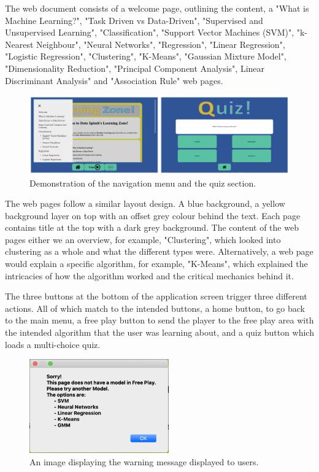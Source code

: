 		The web document consists of a welcome page, outlining the content, a "What is Machine Learning?", "Task Driven vs Data-Driven", "Supervised and Unsupervised Learning", "Classification", "Support Vector Machines (SVM)", "k-Nearest Neighbour", "Neural Networks", "Regression", "Linear Regression", "Logistic Regression", "Clustering", "K-Means", "Gaussian Mixture Model", "Dimensionality Reduction", "Principal Component Analysis", Linear Discriminant Analysis" and "Association Rule" web pages.
		
		\begin{figure}[t]
			\begin{center}
				\includegraphics[width=15cm]{graphics/lz_navi_quiz.png}
				\caption{Demonstration of the navigation menu and the quiz section.}
				\label{fig:lz_navi_quiz}
			\end{center}
		\end{figure}
	
		The web pages follow a similar layout design. A blue background, a yellow background layer on top with an offset grey colour behind the text. Each page contains title at the top with a dark grey background. The content of the web pages either we an overview, for example, "Clustering", which looked into clustering as a whole and what the different types were. Alternatively, a web page would explain a specific algorithm, for example, "K-Means", which explained the intricacies of how the algorithm worked and the critical mechanics behind it.
	
		The three buttons at the bottom of the application screen trigger three different actions. All of which match to the intended buttons, a home button, to go back to the main menu, a free play button to send the player to the free play area with the intended algorithm that the user was learning about, and a quiz button which loads a multi-choice quiz.
	
	\begin{figure}[t]
		\begin{center}
			\includegraphics[width=6cm]{graphics/no_model_warning.png}
			\caption{An image displaying the warning message displayed to users.}
			\label{fig:no_model_warning}
		\end{center}
	\end{figure}
	

